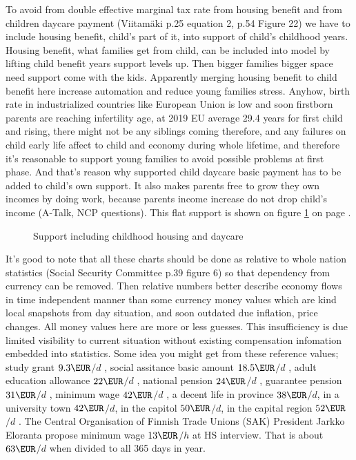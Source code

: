 To avoid from double effective marginal tax rate
from housing benefit and from children daycare payment
(Viitam\"aki\cite{VM_46_2019} p.25 equation 2, p.54 Figure 22)
we have to include housing benefit, child's part of it,
into support of child's childhood years.
Housing benefit, what families get from child,
can be included into model by lifting child benefit years support levels up.
Then bigger families bigger space need support come with the kids.
Apparently merging housing benefit to child benefit here increase automation and reduce young families stress.
Anyhow, birth rate in industrialized countries like European Union is low and soon firstborn parents are reaching infertility age,
at 2019 EU average 29.4 years for first child and rising, there might not be any siblings coming therefore,
and any failures on child early life affect to child and economy during whole lifetime,
and therefore it's reasonable to support young families to avoid possible problems at first phase.
And that's reason why supported child daycare basic payment has to be added to child's own support.
It also makes parents free to grow they own incomes by doing work,
because parents income increase do not drop child's income
(A-Talk\cite{ATalk230413213839}, NCP questions\cite{NCPquestions}).
This flat support is shown on figure \ref{fig:SocialSu2} on page \pageref{fig:SocialSu2}.
\begin{figure} %
 \begin{center}
  \caption{Support including childhood housing and daycare}
  \label{fig:SocialSu2}  
 \end{center}
\end{figure}

It's good to note that all these charts should be done
as relative to whole nation statistics
(Social Security Committee \cite{VN_2023_26} p.39 figure 6)
so that dependency from currency can be removed.
Then relative numbers better describe economy flows in time independent manner
than some currency money values which are kind local snapshots from day situation,
and soon outdated due inflation, price changes.
All money values here are more or less guesses.
This insufficiency is due limited visibility to current situation
without existing compensation infomation embedded into statistics.
Some idea you might get from these reference values;
study grant $9.3\EUR$$\slash d$ \cite{KELA_StudyGrant},
social assitance basic amount $18.5\EUR$$\slash d$ \cite{KELA_BASIC_ASSISTANCE},
adult education allowance $22\EUR$$\slash d$ \cite{AdultEducationAllowance},
national pension $24\EUR$$\slash d$ \cite{KELA_NATIONAL_PENSION},
guarantee pension $31\EUR$$\slash d$ \cite{GUARANTEE_PENSION},
minimum wage $42\EUR$$\slash d$ \cite{KELA_WORK_REQ},
a decent life in province $38\EUR$$\slash d$,
in a university town $42\EUR$$\slash d$,
in the capitol $50\EUR$$\slash d$,
in the capital region $52\EUR$$\slash d$ \cite{THL_2023_1}.
The Central Organisation of Finnish Trade Unions (SAK) President Jarkko Eloranta
propose minimum wage $13\EUR$$\slash h$ at HS interview\cite{HS_202307290200_RS}.
That is about $63\EUR$$\slash d$ when divided to all 365 days in year.

\begin{comment}\end{comment}
